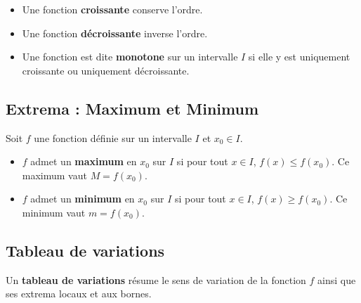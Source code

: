 \begin{rem}
	\nline
	\begin{itemize}
		\item Une fonction \textbf{croissante} conserve l'ordre.
		\item Une fonction \textbf{décroissante} inverse l'ordre.
		\item Une fonction est dite \textbf{monotone} sur un intervalle $I$ si elle y est uniquement croissante ou uniquement décroissante.
	\end{itemize}
\end{rem}

\subsection{Extrema : Maximum et Minimum}

\begin{defin}
	Soit $f$ une fonction définie sur un intervalle $I$ et $x_0 \in I$.
	\begin{itemize}
		\item $f$ admet un \textbf{maximum} en $x_0$ sur $I$ si pour tout $x \in I$, $f(x) \le f(x_0)$. Ce maximum vaut $M = f(x_0)$.
		\item $f$ admet un \textbf{minimum} en $x_0$ sur $I$ si pour tout $x \in I$, $f(x) \ge f(x_0)$. Ce minimum vaut $m = f(x_0)$.
	\end{itemize}
\end{defin}

\subsection{Tableau de variations}

Un \textbf{tableau de variations} résume le sens de variation de la fonction $f$ ainsi que ses extrema locaux et aux bornes.

